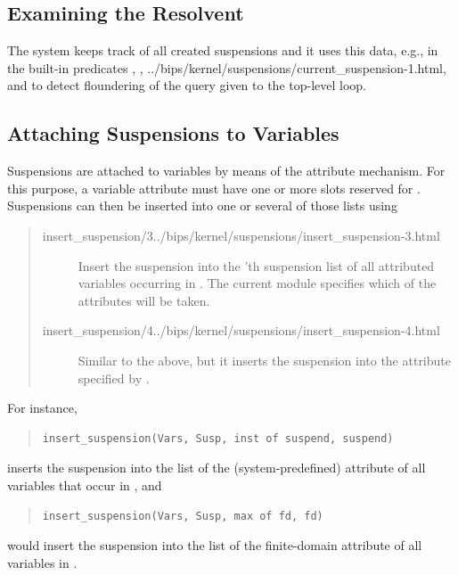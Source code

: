 \subsection{Examining the Resolvent}
The system keeps track of all created suspensions and it
uses this data, e.g., in the built-in predicates
,
,
%
{../bips/kernel/suspensions/current_suspension-1.html},
and to detect floundering of the query given to the {\eclipse} top-level loop.



\subsection{Attaching Suspensions to Variables}


Suspensions are attached to variables by means of the attribute mechanism.
For this purpose, a variable attribute must have one or more slots
reserved for .
Suspensions can then be inserted into one or several of those lists using
\begin{quote}
\begin{description}
\item[%
{insert_suspension/3}{../bips/kernel/suspensions/insert_suspension-3.html}]
Insert the suspension  into the 'th
suspension list of all attributed variables occurring in .
The current module specifies which of the attributes will be taken.

\item[%
{insert_suspension/4}{../bips/kernel/suspensions/insert_suspension-4.html}]
Similar to the above,
but it inserts the suspension into the attribute specified by .
\end{description}
\end{quote}

For instance,
\begin{quote}
\begin{verbatim}
insert_suspension(Vars, Susp, inst of suspend, suspend)
\end{verbatim}
\end{quote}
inserts the suspension into the 
list of the (system-predefined) 
attribute of all variables that occur in , and
\begin{quote}
\begin{verbatim}
insert_suspension(Vars, Susp, max of fd, fd)
\end{verbatim}
\end{quote}
would insert the suspension into the  list of the finite-domain
attribute of all variables in .

